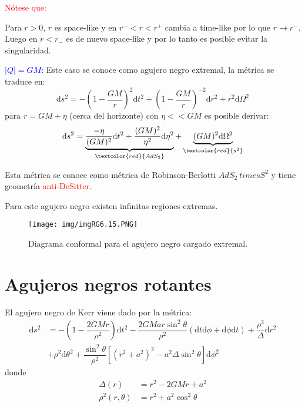 \documentclass[../main]{subfiles}
\begin{document}
\textcolor{red}{Nótese que:}

Para $r>0$, $r$ es space-like y en $r^-< r <r^+$ cambia a time-like por lo que $r\rightarrow r^-$. Luego en $r<r_-$ es de nuevo space-like y por lo tanto es posible evitar la singularidad.

\textcolor{blue}{$|Q|=GM$:} Este caso se conoce como agujero negro extremal, la métrica se traduce en:
\begin{equation}
    \mathrm{d}s^2=-\left(1-\dfrac{GM}{r}\right)^2 \mathrm{d}t^2+\left(1-\dfrac{GM}{r}\right)^{-2}\mathrm{d}r^2+r^2\mathrm{d}\Omega^2
\end{equation}
para $r=GM+\eta$ (cerca del horizonte) con $\eta<< GM$ es posible derivar:
\begin{equation}
    \mathrm{d}s^2=\underbrace{\dfrac{-\eta}{(GM)^2}\mathrm{d}t^2+\dfrac{(GM)^2}{\eta^2}\mathrm{d}\eta^2}_{\textcolor{red}{AdS_2}}+\underbrace{(GM)^2\mathrm{d}\Omega^2}_{\textcolor{red}{s^2}}
\end{equation}

Esta métrica se conoce como métrica de Robinson-Berlotti $AdS_2 \ times S^2$ y tiene geometría \textcolor{red}{anti-DeSitter}.

Para este agujero negro existen infinitas regiones extremas.
\begin{figure}[h]
    \centering
    \texttt{[image: img/imgRG6.15.PNG]}
    \caption{Diagrama conformal para el agujero negro cargado extremal.}
\end{figure}

\section{Agujeros negros rotantes}

El agujero negro de Kerr viene dado por la métrica:
\begin{equation}
    \begin{split}
        \mathrm{d}s^2&=-\left(1-\dfrac{2GMr}{\rho^2}\right)\mathrm{d}t^2-\dfrac{2GMar\sin^2 \theta}{\rho^2}(\mathrm{d}t\mathrm{d}\phi+\mathrm{d}\phi\mathrm{d}t)+\dfrac{\rho^2}{\Delta}\mathrm{d}r^2\\
        &+\rho^2 \mathrm{d}\theta^2+\dfrac{\sin^2 \theta}{\rho^2}\left[(r^2+a^2)^2-a^2\Delta \sin^2 \theta\right]\mathrm{d}\phi^2
    \end{split}
\end{equation}
donde 
\begin{align}
    \Delta(r)&=r^2-2GMr+a^2\\
    \rho^2(r, \theta)&=r^2+a^2\cos^2 \theta
\end{align}
\end{document}
